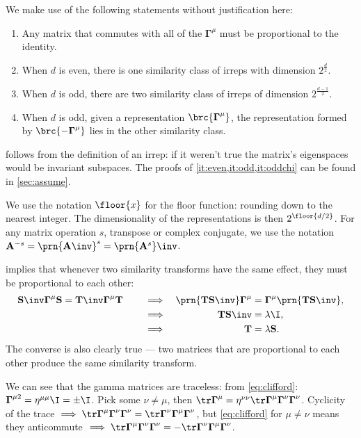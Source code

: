 \documentclass[11pt]{article}
\newcommand{\Gammab}{\boldsymbol{\Gamma}}
\renewcommand{\S}{\mathbf{S}}
\newcommand{\T}{\mathbf{T}}
\newcommand{\A}{\mathbf{A}}
\begin{document}
We make use of the following statements without justification here:
%
\begin{enumerate}
  \item Any matrix that commutes with all of the \(\Gammab^\mu\) must be proportional to the identity.
      \label{it:commute}
  \item When \(d\) is even, there is one similarity class of irreps with dimension \(2^{\frac{d}{2}}\).
      \label{it:even}
  \item When \(d\) is odd, there are two similarity class of irreps of dimension \(2^{\frac{d-1}{2}}\).
      \label{it:odd}
  \item When \(d\) is odd, given a representation \(\brc{\Gammab^\mu}\), the representation formed by \(\brc{ -\Gammab^\mu }\) lies in the other similarity class.
      \label{it:oddchi}
\end{enumerate}
%
 follows from the definition of an irrep: if it weren't true the matrix's eigenspaces would be invariant subspaces.
The proofs of \cref{it:even,it:odd,it:oddchi} can be found in \cref{sec:assume}.

We use the notation \(\floor{x}\) for the floor function: rounding down to the nearest integer.
The dimensionality of the representations is then \(2^{\floor{d/2}}\).
For any matrix operation \(s\), \eg transpose or complex conjugate, we use the notation \( \A^{-s} = \prn{\A\inv}^s = \prn{\A^s}\inv \).

 implies that whenever two similarity transforms have the same effect, they must be proportional to each other:
%
\begin{equation}\label{eq:simsim}
  \S\inv \Gammab^\mu \S = \T\inv \Gammab^\mu \T
  \qquad
  \begin{aligned}[t]
     &\implies &
     \prn{\T \S\inv} \Gammab^\mu &= \Gammab^\mu \prn{\T \S\inv}, \\
     &\implies &
     \T \S\inv &= \lambda \I, \\
     &\implies &
     \T &= \lambda \S.
  \end{aligned}
\end{equation}
%
The converse is also clearly true --- two matrices that are proportional to each other produce the same similarity transform.

We can see that the gamma matrices are traceless: from \cref{eq:clifford}: \( \Gammab^{\mu2} = \eta^{\mu\mu} \I = \pm \I \).
Pick some \(\nu \neq \mu\), then \( \tr \Gammab^\mu = \eta^{\nu\nu} \tr \Gammab^\mu \Gammab^\nu \Gammab^\nu \).
Cyclicity of the trace \( \implies \tr \Gammab^\mu \Gammab^\nu \Gammab^\nu = \tr \Gammab^\nu \Gammab^\mu \Gammab^\nu \), but \cref{eq:clifford} for \(\mu \neq \nu\) means they anticommute \( \implies \tr \Gammab^\mu \Gammab^\nu \Gammab^\nu = - \tr \Gammab^\nu \Gammab^\mu \Gammab^\nu \).
\end{document}

